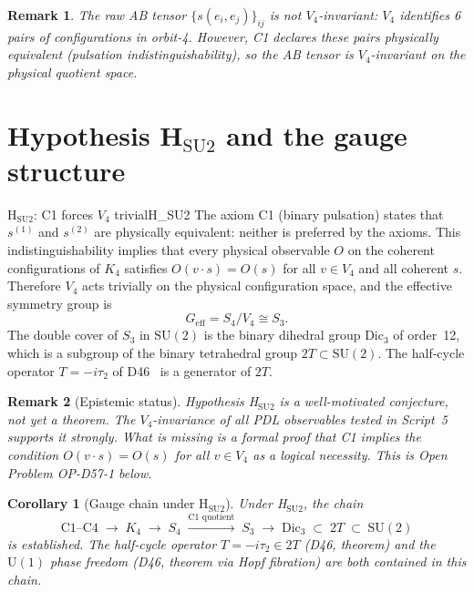 \documentclass[11pt,a4paper]{article}
\newtheorem{corollary}{Corollary}[section]
\newtheorem{remark}{Remark}[section]
\newcommand{\Kfour}{K_4}
\begin{document}
\begin{remark}
The raw AB tensor $\{s(e_i,e_j)\}_{ij}$ is \emph{not} $V_4$-invariant: $V_4$ identifies 6 pairs of configurations in orbit-4. However, C1 declares these pairs physically equivalent (pulsation indistinguishability), so the AB tensor is $V_4$-invariant on the physical quotient space.
\end{remark}

\section{Hypothesis \texorpdfstring{H$_{\mathrm{SU2}}$}{H\_SU2} and the gauge structure}
\label{sec:H_SU2}

\begin{conjbox}{H$_{\mathrm{SU2}}$: C1 forces $V_4$ trivial}{H_SU2}
The axiom C1 (binary pulsation) states that $s^{(1)}$ and $s^{(2)}$ are physically equivalent: neither is preferred by the axioms. This indistinguishability implies that every physical observable $O$ on the coherent configurations of $\Kfour$ satisfies $O(v \cdot s) = O(s)$ for all $v \in V_4$ and all coherent $s$. Therefore $V_4$ acts trivially on the physical configuration space, and the effective symmetry group is
\begin{equation}
G_{\mathrm{eff}} = S_4 / V_4 \cong S_3.
\label{eq:H_SU2}
\end{equation}
The double cover of $S_3$ in $\mathrm{SU}(2)$ is the binary dihedral group $\mathrm{Dic}_3$ of order~12, which is a subgroup of the binary tetrahedral group $2T \subset \mathrm{SU}(2)$. The half-cycle operator $T = -i\tau_2$ of D46~\cite{PDL_D46} is a generator of $2T$.
\end{conjbox}

\begin{remark}[Epistemic status]
Hypothesis H$_{\mathrm{SU2}}$ is a well-motivated conjecture, not yet a theorem. The $V_4$-invariance of all PDL observables tested in Script~5 supports it strongly. What is missing is a formal proof that C1 \emph{implies} the condition $O(v \cdot s) = O(s)$ for all $v \in V_4$ as a logical necessity. This is Open Problem OP-D57-1 below.
\end{remark}

\begin{corollary}[Gauge chain under H$_{\mathrm{SU2}}$]
Under H$_{\mathrm{SU2}}$, the chain
\begin{equation}
\text{C1--C4} \;\to\; \Kfour \;\to\; S_4 \;\xrightarrow{\text{C1 quotient}}\; S_3 \;\to\; \mathrm{Dic}_3 \;\subset\; 2T \;\subset\; \mathrm{SU}(2)
\label{eq:chain}
\end{equation}
is established. The half-cycle operator $T = -i\tau_2 \in 2T$ (D46, theorem) and the $\mathrm{U}(1)$ phase freedom (D46, theorem via Hopf fibration) are both contained in this chain.
\end{corollary}
\end{document}
